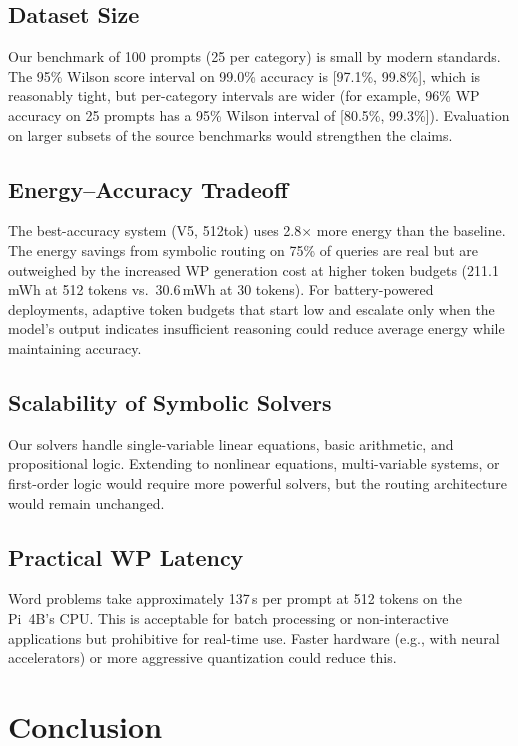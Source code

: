\documentclass[journal]{IEEEtai}
\begin{document}
\subsection{Dataset Size}
Our benchmark of 100 prompts (25 per category) is small by modern standards. The 95\% Wilson score interval on 99.0\% accuracy is [97.1\%, 99.8\%], which is reasonably tight, but per-category intervals are wider (for example, 96\% WP accuracy on 25 prompts has a 95\% Wilson interval of [80.5\%, 99.3\%]). Evaluation on larger subsets of the source benchmarks would strengthen the claims.

\subsection{Energy--Accuracy Tradeoff}
The best-accuracy system (V5, 512tok) uses 2.8$\times$ more energy than the baseline. The energy savings from symbolic routing on 75\% of queries are real but are outweighed by the increased WP generation cost at higher token budgets (211.1\,mWh at 512 tokens vs.\ 30.6\,mWh at 30 tokens). For battery-powered deployments, adaptive token budgets that start low and escalate only when the model's output indicates insufficient reasoning could reduce average energy while maintaining accuracy.

\subsection{Scalability of Symbolic Solvers}
Our solvers handle single-variable linear equations, basic arithmetic, and propositional logic. Extending to nonlinear equations, multi-variable systems, or first-order logic would require more powerful solvers, but the routing architecture would remain unchanged.

\subsection{Practical WP Latency}
Word problems take approximately 137\,s per prompt at 512 tokens on the Pi~4B's CPU. This is acceptable for batch processing or non-interactive applications but prohibitive for real-time use. Faster hardware (e.g., with neural accelerators) or more aggressive quantization could reduce this.

\section{Conclusion}
\label{sec:conclusion}
\end{document}
